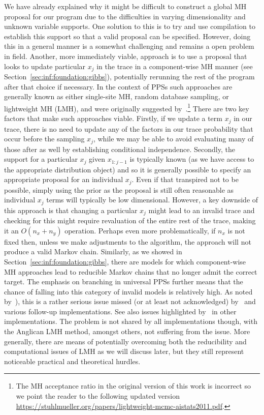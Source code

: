 We have already explained why it might be difficult to construct a global MH proposal for
our program due to the difficulties in varying dimensionality and unknown variable supports.
One solution to this is to try and use compilation to establish this support so that
a valid proposal can be specified.  However, doing this in a general manner is a somewhat
challenging and remains a open problem in field.  Another, more immediately viable,
approach is to use a proposal that looks to update particular $x_j$ in the trace in a
component-wise MH manner (see Section~\ref{sec:inf:foundation:gibbs}), potentially rerunning
the rest of the program after that choice if necessary.  In the context of PPSs such
approaches are generally known as either single-site MH, random database sampling, or lightweight MH (LMH), and were
originally suggested by~\citep{wingate2011lightweight}.\footnote{The MH acceptance ratio in the original version of this work
	is incorrect so we point the reader to the following updated version
	\url{https://stuhlmueller.org/papers/lightweight-mcmc-aistats2011.pdf}.} There are two key factors
that make such approaches viable.  Firstly, if we update a term $x_j$ in our trace, there is
no need to update any of the factors in our trace probability that occur before the sampling
$x_j$, while we may be able to avoid evaluating many of those after as well by establishing
conditional independence.  Secondly, the support for a particular $x_j$ given
$x_{1:j-1}$ is typically known (as 
we have access to the appropriate distribution object) and so it is generally possible to specify
an appropriate proposal for an individual $x_j$.  Even if that transpired not to be possible, 
simply using the prior as the proposal is still often reasonable as individual $x_j$ terms will typically
be low dimensional.  However, a key downside of this approach is that changing a particular $x_j$
might lead to an invalid trace and checking for this might require revaluation of the entire rest of the
trace, making it an $O(n_x+n_y)$ operation.  Perhaps even more problematically, if $n_x$ is not fixed
then, unless we make adjustments to the algorithm, the approach will not produce a 
valid Markov chain.  Similarly, as we showed in Section~\ref{sec:inf:foundation:gibbs},
there are models for which component-wise MH approaches lead to reducible Markov chains
that no longer admit the correct target.  The emphasis on branching in universal PPSs further
means that the chance of falling into this category of invalid models is relatively high.  As
noted by~\citep{kiselyov2016problems}), this is a rather serious issue missed (or at least not
acknowledged) by~\cite{wingate2011lightweight} and various follow-up implementations.
See also issues highlighted by~\citep{hur2015provably} in other implementations.
The problem is not shared by all implementations though, with the Anglican LMH method, amongst
others, not suffering from the issue.
More generally, there are means of potentially overcoming both the reducibility and computational
issues of LMH as we will discuss later, but
they still represent noticeable practical and theoretical hurdles.

